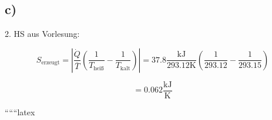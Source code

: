 

\subsection*{c)}
2. HS aus Vorlesung:

\[
S_{\text{erzeugt}} = \left| \frac{\dot{Q}}{\overline{T}} \left( \frac{1}{T_{\text{heiß}}} - \frac{1}{T_{\text{kalt}}} \right) \right| = 37.8 \frac{\text{kJ}}{293.12 \text{K}} \left( \frac{1}{293.12} - \frac{1}{293.15} \right)
\]

\[
= 0.062 \frac{\text{kJ}}{\text{K}}
\]

``````latex